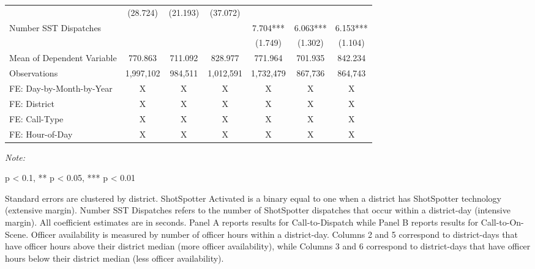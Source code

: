 \begin{table}[H]
\begin{threeparttable}
\begin{tabular}[t]{lcccccc}
\hspace{1em} & (28.724) & (21.193) & (37.072) &  &  & \\
\hspace{1em}Number SST Dispatches &  &  &  & 7.704*** & 6.063*** & 6.153***\\
\hspace{1em} &  &  &  & (1.749) & (1.302) & (1.104)\\
\hspace{1em}Mean of Dependent Variable & 770.863 & 711.092 & 828.977 & 771.964 & 701.935 & 842.234\\
\hspace{1em}Observations & 1,997,102 & 984,511 & 1,012,591 & 1,732,479 & 867,736 & 864,743\\
\midrule
FE: Day-by-Month-by-Year & X & X & X & X & X & X\\
FE: District & X & X & X & X & X & X\\
FE: Call-Type & X & X & X & X & X & X\\
FE: Hour-of-Day & X & X & X & X & X & X\\
\bottomrule
\end{tabular}
\begin{tablenotes}
\item \textit{Note: } 
\item * p < 0.1, ** p < 0.05, *** p < 0.01
\item Standard errors are clustered by district.                       ShotSpotter Activated is a binary equal to one when                      a district has ShotSpotter technology (extensive margin).                      Number SST Dispatches refers to the number of                      ShotSpotter dispatches that occur within a district-day (intensive margin).                      All coefficient estimates are in seconds. Panel A reports results for                      Call-to-Dispatch while Panel B reports results for Call-to-On-Scene.                      Officer availability is measured by number of officer hours within a district-day.                       Columns 2 and 5 correspond to district-days that have officer hours above                      their district median (more officer availability), while Columns 3 and 6 correspond to district-days that                      have officer hours below their district median (less officer availability).                  
\end{tablenotes}
\end{threeparttable}
\end{table}

